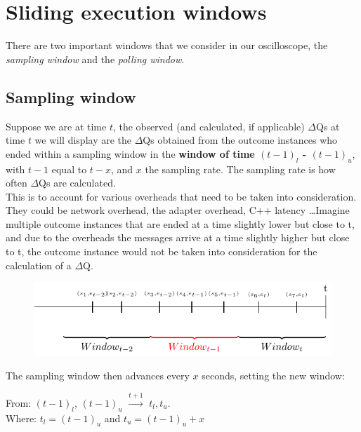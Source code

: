 \section{Sliding execution windows}

    There are two important windows that we consider in our oscilloscope, the \textit{sampling window} and the \textit{polling window}.

    \subsection{Sampling window}
    Suppose we are at time $t$, the observed (and calculated, if applicable) $\Delta$Qs at time $t$ we will display are the $\Delta$Qs obtained from the outcome instances who ended within a sampling window in the \textbf{window of time $(t-1)_{l}$ - $(t-1)_u$}, with $t-1$ equal to $t - x$, and $x$ the sampling rate. The sampling rate is how often $\Delta$Qs are calculated. \\
    This is to account for various overheads that need to be taken into consideration. They could be network overhead, the adapter overhead, C++ latency \dots Imagine multiple outcome instances that are ended at a time slightly lower but close to t, and due to the overheads the messages arrive at a time slightly higher but close to t, the outcome instance would not be taken into consideration for the calculation of a $\Delta$Q.
    
    \begin{figure}[H]
        \begin{center}
            \includegraphics{tikz/window.pdf}
        \end{center}
    \end{figure}
    
    The sampling window then advances every $x$ seconds, setting the new window: 
    \begin{center}
        From: $(t-1)_l$, $(t-1)_u$ $\xrightarrow{t + 1}$ $t_l, t_u$. \\
        Where: $t_l = (t-1)_u$ and $t_u = (t-1)_u + x$ 
    \end{center}
    
